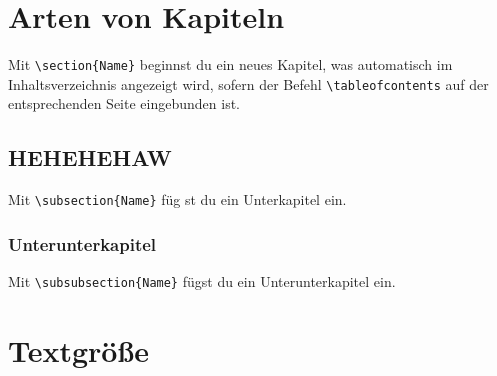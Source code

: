 \documentclass[50pt, a4paper]{article}
\begin{document}
\begin{figure}[h]%
\centering %
\end{figure}

\section{Arten von Kapiteln}

Mit \verb|\section{Name}| beginnst du ein neues Kapitel, was automatisch im Inhaltsverzeichnis angezeigt wird, sofern der Befehl \verb|\tableofcontents| auf der entsprechenden Seite eingebunden ist.

\subsection{HEHEHEHAW}

Mit \verb|\subsection{Name}| f\"ug st du ein Unterkapitel ein.

\subsubsection{Unterunterkapitel}

Mit \verb|\subsubsection{Name}| f\"ugst du ein Unterunterkapitel ein.

\section{Textgr\"o\ss e}



\end{document}
